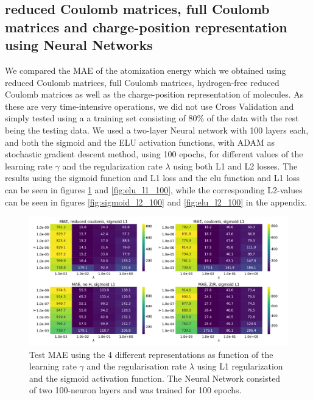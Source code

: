 \documentclass[11pt,a4paper,notitlepage]{article}
\begin{document}
\subsection{reduced Coulomb matrices, full Coulomb matrices and charge-position representation using Neural Networks}
We compared the MAE of the atomization energy which we obtained using reduced Coulomb matrices, full Coulomb matrices, hydrogen-free reduced Coulomb matrices as well as the charge-position representation of molecules. As these are very time-intensive operations, we did not use Cross Validation and simply tested using a a training set consisting of 80\% of the data with the rest being the testing data. We used a two-layer Neural network with 100 layers each, and both the sigmoid and the ELU activation functions, with ADAM as stochastic gradient descent method, using 100 epochs, for different values of the learning rate $\gamma$ and the regularization rate $\lambda$ using both L1 and L2 losses. The results using the sigmoid function and L1 loss and the elu function and L1 loss can be seen in figures \ref{fig:sigmoid_l1_100} and \ref{fig:elu_l1_100}, while the corresponding L2-values can be seen in figures \ref{fig:sigmoid_l2_100} and \ref{fig:elu_l2_100} in the appendix.
\begin{figure}[H]
\centering
\includegraphics[width=1\textwidth]{nn_100_sigmoid L1.pdf}
\caption[NN sigmoid L1, 100 epochs]{Test MAE using the 4 different representations as function of the learning rate $\gamma$ and the regularisation rate $\lambda$ using L1 regularization and the sigmoid activation function. The Neural Network consisted of two 100-neuron layers and was trained for 100 epochs.} \label{fig:sigmoid_l1_100}
\end{figure}
\end{document}
